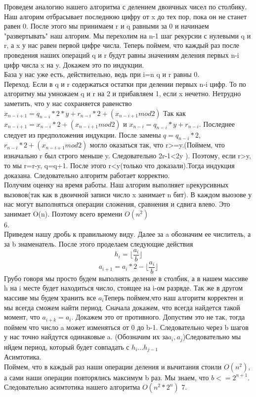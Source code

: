 \documentclass[a4paper,12pt]{article}
\begin{document}
Проведем аналогию нашего алгоритма с делением двоичных чисел по столбику.
Наш алгорим отбрасывает последнюю цифру от x до тех пор, пока он не станет равен 0. После этого мы принимаем r и q равными за 0 и начинаем "развертывать" наш алгорим. Мы перехолим на n-1 шаг рекурсии с нулевыми q и r, а x у нас равен первой цифре числа. Теперь поймем, что каждый раз после проведения наших операций q и r будут равны значениям деления первых n-i цифр числа x на y. Докажем это по индукции.\\
 База у нас уже есть, действительно, ведь при i=n q и r равны 0.\\
 Переход. Если в q и r содержаться остатки при делении первых n-i цифр. То по алгоритму мы умножаем q и r на 2 и прибавляем 1, если x нечетно. Нетрудно заметить, что у нас сохраняется равенство $x_{n-i+1}=q_{n-i}*2*y+r_{n-i}*2+(x_{n-i+1} mod 2)$ Так как $x_{n-i+1}=x_{n-i}*2+(x_{n-i+1} mod 2)$ и $x_{n-i}=q_{n-i}*y+r_{n-i}$. Последнее следует из предположения индукции. После замены $q=q_{n-i}*2$, $r_{n-i}*2+(x_{n-i+1} mod 2)$ могло оказаться так, что r>=y.(Поймем, что изначально r был строго меньше y. Следовательно 2r-1<2y ). Поэтому, если r>y, то мы r=r-y, q=q+1. После этого r<y(только что доказали).Тогда индукция доказана. Следовательно алгоритм работает корректно.\\
 Получим оценку на время работы. Наш алгорим выполняет nрекурсивных вызовов(так как в двоичной записи число x занимает n бит). В каждом выозове у нас могут выполняться операции сложения, сравнения и сдвига влево. Это занимает O(n). Поэтому всего времени $O(n^2)$\\
 6.\\
 Приведем нашу дробь к правильному виду. Далее за a обозначим ее числитель, а за b знаменатель. После этого проделаем следующие действия \[h_i=\lfloor \frac{a_i}{b}\rfloor\]\[ a_{i+1}=a_i*2-\lfloor \frac{a_i}{b}\rfloor\]
 Грубо говоря мы просто будем выполнять деление в столбик, а в нашем массиве h на i месте будет находиться число, стоящее на i-ом разряде. Так же в другом массиве мы будем хранить все $a_i$Теперь поймем,что наш алгоритм корректен и мы всегда сможем найти период. Сначала докажем, что всегда найдется такой момент, что $a_{i+k}=a_i$. Докажем это от противного. Допустим это не так, тогда поймем что число a может изменяться от 0 до b-1. Следовательно через b шагов у нас точно найдутся одинаковые a. (Обозначим их за$a_i, a_{j}$)Следовательно мы нйдем период, который будет совпадать с $h_i ... h_{j-1}$\\
 Асимтотика. \\
 Поймем, что в каждый раз наши операции деления и вычитания стоили $O(n^2)$, а сами наши операции повторялись максимум b раз. Мы знаем, что $b<=2^{n+1}$. Следовательно асимтотика нашего алгоритма $O(n^2* 2^{n})$
7.\\
 
\end{document}
